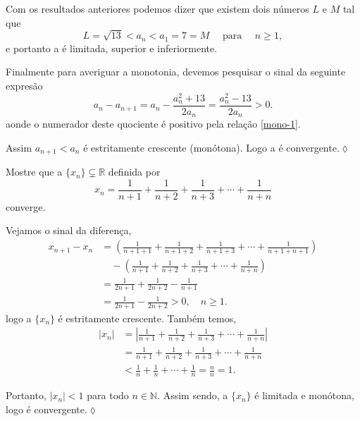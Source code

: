 Com os resultados anteriores podemos dizer que existem dois n\'{u}meros $L$ e $M$ tal que
\begin{equation*}
    L=\sqrt{13}<a_n<a_1=7=M\quad\text{ para }\quad n\geq 1,
\end{equation*}
e portanto a \seq \'{e} limitada, superior e inferiormente.

Finalmente para averiguar a monotonia, devemos pesquisar o sinal da seguinte expres\~{a}o
\begin{equation*}
    a_n-a_{n+1}=a_n-\frac{a_n^2+13}{2a_n}=\frac{a_n^2-13}{2a_n}>0.
\end{equation*}
aonde o numerador deste quociente \'{e} positivo pela rela\c{c}\~{a}o
\eqref{mono-1}.

Assim $a_{n+1} < a_n$ \'{e} estritamente crescente (mon\'{o}tona). Logo a
\seq  \'{e} convergente.\hfill \(\lozenge\)

\begin{exer}
Mostre que a \seq $\{x_n\}\subsetneq \mathbb{R}$  definida por
\begin{equation*}
    x_n=\frac{1}{n+1}+\frac{1}{n+2}+\frac{1}{n+3}+\cdots+\frac{1}{n+n}
\end{equation*}
converge.
\end{exer}

\solo Vejamos o sinal da diferen\c{c}a,
\begin{align*}
    x_{n+1}-x_n&=\left(\frac{1}{n+1+1}+\frac{1}{n+1+2}+\frac{1}{n+1+3}+\cdots+\frac{1}{n+1+n+1} \right)\\[2ex]
           &\quad -\left(\frac{1}{n+1}+\frac{1}{n+2}+\frac{1}{n+3}+\cdots+\frac{1}{n+n} \right)\\[2ex]
   &=\frac{1}{2n+1}+\frac{1}{2n+2}-\frac{1}{n+1}  \\[2ex]
   &=\frac{1}{2n+1}-\frac{1}{2n+2}>0,\quad n \geq 1.
\end{align*}
logo a \seq $\{x_n\}$ \'{e} estritamente crescente. Tamb\'{e}m temos,
\begin{align*}
    |x_n|&=\left|\frac{1}{n+1}+\frac{1}{n+2}+\frac{1}{n+3}+\cdots+\frac{1}{n+n} \right|\\[2ex]
         &=\frac{1}{n+1}+\frac{1}{n+2}+\frac{1}{n+3}+\cdots+\frac{1}{n+n}\\[2ex]
         &<\frac{1}{n}+\frac{1}{n}+\cdots+\frac{1}{n}=\frac{n}{n}=1.
\end{align*}

Portanto, $|x_n|<1$ para todo $n\in \mathbb{N}$. Assim sendo, a \seq $\{x_n\}$ \'{e} limitada e mon\'{o}tona, logo \'{e} convergente.\hfill \(\lozenge\)

